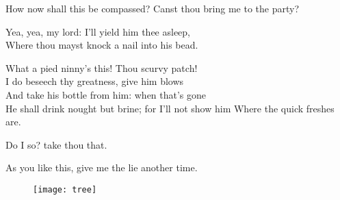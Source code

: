 

\begin{verse_speech}[Stephano] How now shall this be compassed?
Canst thou bring me to the party?
\end{verse_speech}

\begin{verse_speech}[Caliban] 
Yea, yea, my lord: I'll yield him thee asleep,\\
Where thou mayst knock a nail into his bead.
\end{verse_speech}



\begin{verse_speech}[Caliban] 
What a pied ninny's this! Thou scurvy patch!\\
I do beseech thy greatness, give him blows\\
And take his bottle from him: when that's gone\\
He shall drink nought but brine; for I'll not show him
Where the quick freshes are.
\end{verse_speech}





\begin{verse_speech}[Stephano] 
Do I so? take thou that.
	
	
As you like this, give me the lie another time.
\end{verse_speech}

\begin{letter}
	\begin{figure}[bt]
\centering
\texttt{[image: tree]}
\end{figure}
\end{letter}

